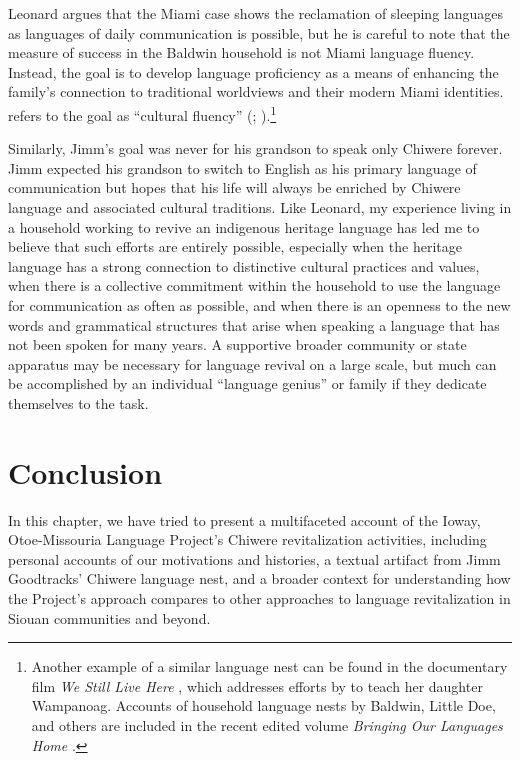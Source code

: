 \documentclass[output=paper]{LSP/langsci}
\begin{document}
Leonard argues that the Miami case shows the reclamation of sleeping languages as languages of daily communication is possible, but he is careful to note that the measure of success in the Baldwin household is not Miami language fluency. Instead, the goal is to develop language proficiency as a means of enhancing the family's connection to traditional worldviews and their modern Miami identities.  refers to the goal as ``cultural fluency'' (\citealt[36--37]{Leonard2007}; \citeyear[139--140]{Leonard2011}).\footnote{Another example of a similar language nest can be found in the documentary film \emph{We Still Live Here} \citep{Makepeace2011}, which addresses efforts by  to teach her daughter Wampanoag. Accounts of household language nests by Baldwin, Little Doe, and others are included in the recent edited volume \emph{Bringing Our Languages Home} \citep{Hinton2013}.} 

Similarly, Jimm's goal was never for his grandson to speak only Chiwere forever. Jimm expected his grandson to switch to English as his primary language of communication but hopes that his life will always be enriched by Chiwere language and associated cultural traditions. Like Leonard, my experience living in a household working to revive an indigenous heritage language has led me to believe that such efforts are entirely possible, especially when the heritage language has a strong connection to distinctive cultural practices and values, when there is a collective commitment within the household to use the language for communication as often as possible, and when there is an openness to the new words and grammatical structures that arise when speaking a language that has not been spoken for many years. A supportive broader community or state apparatus may be necessary for language revival on a large scale, but much can be accomplished by an individual ``language genius'' or family if they dedicate themselves to the task.

\section{Conclusion}
In this chapter, we have tried to present a multifaceted account of the Ioway, Otoe-Missouria Language Project's Chiwere revitalization activities, including personal accounts of our motivations and histories, a textual artifact from Jimm Goodtracks' Chiwere language nest, and a broader context for understanding how the Project's approach compares to other approaches to language revitalization in Siouan communities and beyond.
\end{document}

